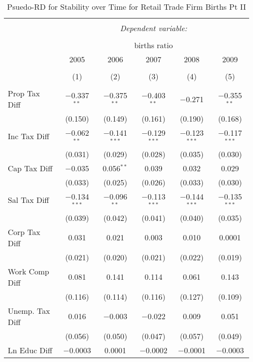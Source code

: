 
\begin{table}[!htbp] \centering 
  \caption{Psuedo-RD for Stability over Time for  Retail Trade Firm Births Pt II} 
  \label{44-45year} 
\small 
\begin{tabular}{@{\extracolsep{5pt}}lccccc} 
\\[-1.8ex]\hline 
\hline \\[-1.8ex] 
 & \multicolumn{5}{c}{\textit{Dependent variable:}} \\ 
\cline{2-6} 
\\[-1.8ex] & \multicolumn{5}{c}{births ratio} \\ 
 & 2005 & 2006 & 2007 & 2008 & 2009 \\ 
\\[-1.8ex] & (1) & (2) & (3) & (4) & (5)\\ 
\hline \\[-1.8ex] 
 Prop Tax Diff & $-$0.337$^{**}$ & $-$0.375$^{**}$ & $-$0.403$^{**}$ & $-$0.271 & $-$0.355$^{**}$ \\ 
  & (0.150) & (0.149) & (0.161) & (0.190) & (0.168) \\ 
  Inc Tax Diff & $-$0.062$^{**}$ & $-$0.141$^{***}$ & $-$0.129$^{***}$ & $-$0.123$^{***}$ & $-$0.117$^{***}$ \\ 
  & (0.031) & (0.029) & (0.028) & (0.035) & (0.030) \\ 
  Cap Tax Diff & $-$0.035 & 0.056$^{**}$ & 0.039 & 0.032 & 0.029 \\ 
  & (0.033) & (0.025) & (0.026) & (0.033) & (0.030) \\ 
  Sal Tax Diff & $-$0.134$^{***}$ & $-$0.096$^{**}$ & $-$0.113$^{***}$ & $-$0.144$^{***}$ & $-$0.135$^{***}$ \\ 
  & (0.039) & (0.042) & (0.041) & (0.040) & (0.035) \\ 
  Corp Tax Diff & 0.031 & 0.021 & 0.003 & 0.010 & 0.0001 \\ 
  & (0.021) & (0.020) & (0.021) & (0.022) & (0.019) \\ 
  Work Comp Diff & 0.081 & 0.141 & 0.114 & 0.061 & 0.143 \\ 
  & (0.116) & (0.114) & (0.116) & (0.127) & (0.109) \\ 
  Unemp. Tax Diff & 0.016 & $-$0.003 & $-$0.022 & 0.009 & 0.051 \\ 
  & (0.056) & (0.050) & (0.047) & (0.057) & (0.049) \\ 
  Ln Educ Diff & $-$0.0003 & 0.0001 & $-$0.0002 & $-$0.0001 & $-$0.0003 \\ 

\end{tabular}
\end{table}
